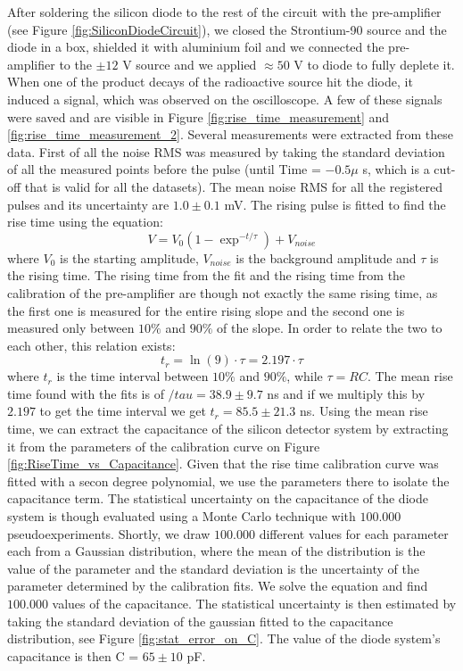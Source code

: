 \documentclass[12pt]{article}
\begin{document}
After soldering the silicon diode to the rest of the circuit with the pre-amplifier (see Figure \ref{fig:SiliconDiodeCircuit}), we closed the Strontium-90 source and the diode in a box, shielded it with aluminium foil and we connected the pre-amplifier to the $\pm 12$ V source and we applied $\approx 50$ V to diode to fully deplete it. When one of the product decays of the radioactive source hit the diode, it induced a signal, which was observed on the oscilloscope. A few of these signals were saved and are visible in Figure \ref{fig:rise_time_measurement} and \ref{fig:rise_time_measurement_2}. Several measurements were extracted from these data. First of all the noise RMS was measured by taking the standard deviation of all the measured points before the pulse (until Time = $-0.5\mu$ s, which is a cut-off that is valid for all the datasets). The mean noise RMS for all the registered pulses and its uncertainty are $1.0 \pm 0.1$ mV.
The rising pulse is fitted to find the rise time using the equation:
\begin{equation}
  V = V_{0} (1 - \exp^{-t/\tau}) + V_{noise}
  \label{eq:rise_time}
\end{equation}
where $V_{0}$ is the starting amplitude, $V_{noise}$ is the background amplitude and $\tau$ is the rising time. The rising time from the fit and the rising time from the calibration of the pre-amplifier are though not exactly the same rising time, as the first one is measured for the entire rising slope and the second one is measured only between $10\%$ and $90\%$ of the slope. In order to relate the two to each other, this relation exists:
\begin{equation}
t_{r} = \ln(9) \cdot \tau = 2.197 \cdot \tau
\end{equation}
where $t_{r}$ is the time interval between $10\%$ and $90\%$, while $\tau = RC$. 
The mean rise time found with the fits is of $/tau = 38.9 \pm 9.7$ ns and if we multiply this by $2.197$ to get the time interval we get $t_{r} = 85.5 \pm 21.3$ ns. Using the mean rise time, we can extract the capacitance of the silicon detector system by extracting it from the parameters of the calibration curve on Figure \ref{fig:RiseTime_vs_Capacitance}. Given that the rise time calibration curve was fitted with a secon degree polynomial, we use the parameters there to isolate the capacitance term. The statistical uncertainty on the capacitance of the diode system is though evaluated using a Monte Carlo technique with $100.000$ pseudoexperiments. Shortly, we draw $100.000$ different values for each parameter each from a Gaussian distribution, where the mean of the distribution is the value of the parameter and the standard deviation is the uncertainty of the parameter determined by the calibration fits. We solve the equation and find $100.000$ values of the capacitance. The statistical uncertainty is then estimated by taking the standard deviation of the gaussian fitted to the capacitance distribution, see Figure \ref{fig:stat_error_on_C}. The value of the diode system's capacitance is then C = $65 \pm 10$ pF.
\end{document}
